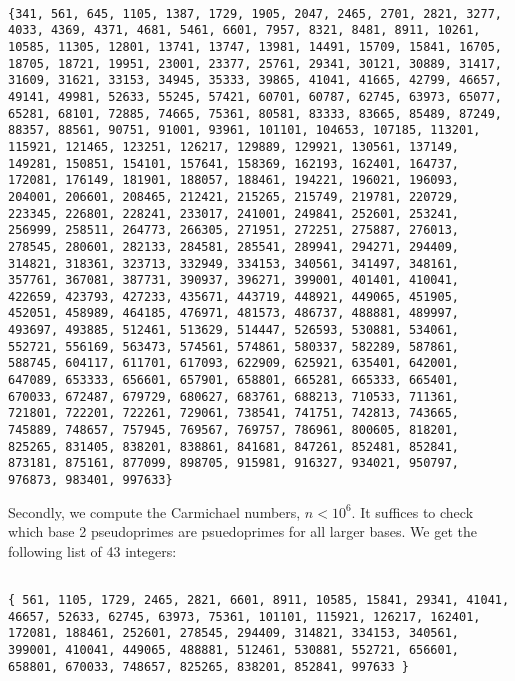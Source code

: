 \documentclass[10pt,a4paper]{report}
\begin{document}
\begin{lstlisting}[breaklines]

{341, 561, 645, 1105, 1387, 1729, 1905, 2047, 2465, 2701, 2821, 3277, 4033, 4369, 4371, 4681, 5461, 6601, 7957, 8321, 8481, 8911, 10261, 10585, 11305, 12801, 13741, 13747, 13981, 14491, 15709, 15841, 16705, 18705, 18721, 19951, 23001, 23377, 25761, 29341, 30121, 30889, 31417, 31609, 31621, 33153, 34945, 35333, 39865, 41041, 41665, 42799, 46657, 49141, 49981, 52633, 55245, 57421, 60701, 60787, 62745, 63973, 65077, 65281, 68101, 72885, 74665, 75361, 80581, 83333, 83665, 85489, 87249, 88357, 88561, 90751, 91001, 93961, 101101, 104653, 107185, 113201, 115921, 121465, 123251, 126217, 129889, 129921, 130561, 137149, 149281, 150851, 154101, 157641, 158369, 162193, 162401, 164737, 172081, 176149, 181901, 188057, 188461, 194221, 196021, 196093, 204001, 206601, 208465, 212421, 215265, 215749, 219781, 220729, 223345, 226801, 228241, 233017, 241001, 249841, 252601, 253241, 256999, 258511, 264773, 266305, 271951, 272251, 275887, 276013, 278545, 280601, 282133, 284581, 285541, 289941, 294271, 294409, 314821, 318361, 323713, 332949, 334153, 340561, 341497, 348161, 357761, 367081, 387731, 390937, 396271, 399001, 401401, 410041, 422659, 423793, 427233, 435671, 443719, 448921, 449065, 451905, 452051, 458989, 464185, 476971, 481573, 486737, 488881, 489997, 493697, 493885, 512461, 513629, 514447, 526593, 530881, 534061, 552721, 556169, 563473, 574561, 574861, 580337, 582289, 587861, 588745, 604117, 611701, 617093, 622909, 625921, 635401, 642001, 647089, 653333, 656601, 657901, 658801, 665281, 665333, 665401, 670033, 672487, 679729, 680627, 683761, 688213, 710533, 711361, 721801, 722201, 722261, 729061, 738541, 741751, 742813, 743665, 745889, 748657, 757945, 769567, 769757, 786961, 800605, 818201, 825265, 831405, 838201, 838861, 841681, 847261, 852481, 852841, 873181, 875161, 877099, 898705, 915981, 916327, 934021, 950797, 976873, 983401, 997633}

\end{lstlisting}

Secondly, we compute the Carmichael numbers, $n < 10^6$.  It suffices to check which base 2 pseudoprimes are psuedoprimes for all larger bases. We get the following list of 43 integers: 

\begin{lstlisting}[breaklines]

{ 561, 1105, 1729, 2465, 2821, 6601, 8911, 10585, 15841, 29341, 41041, 46657, 52633, 62745, 63973, 75361, 101101, 115921, 126217, 162401, 172081, 188461, 252601, 278545, 294409, 314821, 334153, 340561, 399001, 410041, 449065, 488881, 512461, 530881, 552721, 656601, 658801, 670033, 748657, 825265, 838201, 852841, 997633 }

\end{lstlisting}
\end{document}
